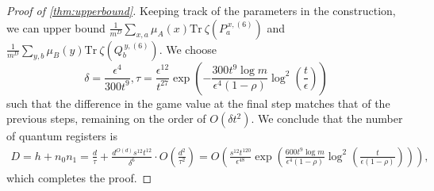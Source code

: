 \documentclass[11pt]{article}
\theoremstyle{plain}
\theoremstyle{definition}
\newcommand {\br} [1] {\ensuremath{ \left( #1 \right) }}
\newcommand {\Tr} {\ensuremath{ \mathrm{Tr} }}
\newcommand{\Pnn}[1] {\ensuremath{{P^{\,x, (#1)}_a}}}
\newcommand{\Qnn}[1] {\ensuremath{{Q^{\,y, (#1)}_b}}}
\newcommand{\1}{\mathbb{1}} %
\begin{document}
\begin{proof}[Proof of \cref{thm:upperbound}]
Keeping track of the parameters in the construction, we can upper bound $\frac{1}{m^{D}}\sum_{x,a}\mu_A(x)\Tr~\zeta\br{\Pnn{6}}$ and $\frac{1}{m^{D}}\sum_{y,b}\mu_B(y)\Tr~\zeta\br{\Qnn{6}}$. 
We choose
\begin{equation}\label{eqn:paramters}
  \delta=\frac{\epsilon^4}{300t^9}, \tau=\frac{\epsilon^{12}}{t^{27}}\exp\br{-\frac{300t^{9}\log m}{\epsilon^4(1-\rho)}\log^2\br{\frac{t}{\epsilon}}}
\end{equation}
such that the difference in the game value at the final step matches that of the previous steps, remaining on the order of $O(\delta t^2)$. We conclude that the number of quantum registers is
 \begin{align*}
     D = h + n_0n_1 = \frac{d}{\tau} + \frac{d^{O(d)}s^{12}t^{12}}{\delta^6}\cdot O\br{\frac{d^2}{\tau^2}} = O\br{\frac{s^{12}t^{120}}{\epsilon^{48}}\exp\br{\frac{600t^{9}\log m}{\epsilon^4(1-\rho)}\log^2\br{\frac{t}{\epsilon(1-\rho)}}}},
 \end{align*}
 which completes the proof.
\end{proof}
%
\end{document}
